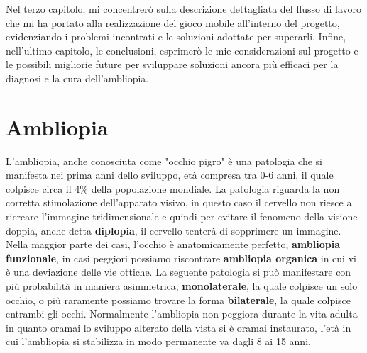 \documentclass[
a4paper,
cleardoublepage=empty,
headings=twolinechapter,
numbers=autoenddot,
]{scrbook}
\begin{document}
	Nel terzo capitolo, mi concentrerò sulla descrizione dettagliata del flusso di lavoro che mi ha portato alla realizzazione del gioco mobile all'interno del progetto, evidenziando i problemi incontrati e le soluzioni adottate per superarli. Infine, nell'ultimo capitolo, le conclusioni, esprimerò le mie considerazioni sul progetto e le possibili migliorie future per sviluppare soluzioni ancora più efficaci per la diagnosi e la cura dell'ambliopia.
	 
	\chapter{Ambliopia}
	L'ambliopia, anche conosciuta come "occhio pigro" è una patologia che si manifesta nei prima anni dello sviluppo, età compresa tra 0-6 anni, il quale colpisce circa il 4\% della popolazione mondiale.
	La patologia riguarda la non corretta stimolazione dell'apparato visivo, in questo caso il cervello non riesce a ricreare l'immagine tridimensionale e quindi per evitare il fenomeno della visione doppia, anche detta \textbf{diplopia}, il cervello tenterà di sopprimere un immagine.
	Nella maggior parte dei casi, l'occhio è anatomicamente perfetto, \textbf{ambliopia funzionale}, in casi peggiori possiamo riscontrare \textbf{ambliopia organica} in cui vi è una deviazione delle vie ottiche.
	La seguente patologia si può manifestare con più probabilità in maniera asimmetrica, \textbf{monolaterale}, la quale colpisce un solo occhio, o più raramente possiamo trovare la forma \textbf{bilaterale}, la quale colpisce entrambi gli occhi.
	Normalmente l'ambliopia non peggiora durante la vita adulta in quanto oramai lo sviluppo alterato della vista si è oramai instaurato, l'età in cui l'ambliopia si stabilizza in modo permanente va dagli 8 ai 15 anni.
\end{document}
